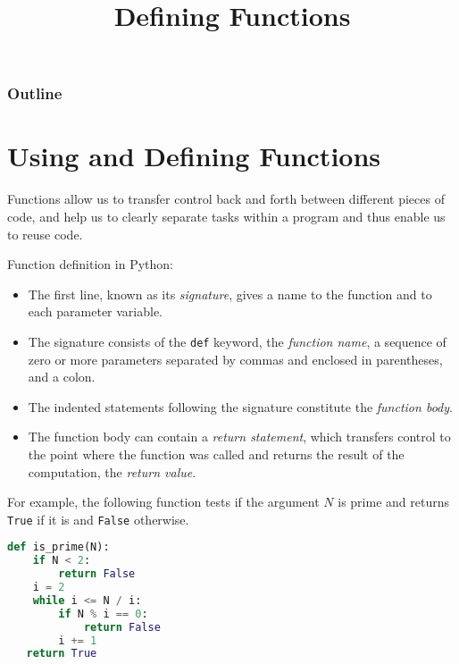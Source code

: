 \documentclass[8pt,a4paper,compress,handout]{beamer}
\title{Defining Functions}
\date{}
\begin{document}
\begin{frame}
\vfill
\titlepage
\end{frame}

\begin{frame}
\frametitle{Outline}
\tableofcontents
\end{frame}

\section{Using and Defining Functions}
\begin{frame}[fragile]
Functions allow us to transfer control back and forth between different pieces of code, and help us to clearly separate tasks within a program and thus enable us to reuse code.

\bigskip

Function definition in Python:
\begin{itemize}
\item The first line, known as its \emph{signature}, gives a name to the function and to each parameter variable.

\item The signature consists of the \lstinline{def} keyword, the \emph{function name}, a sequence of zero or more parameters separated by commas and enclosed in parentheses, and a colon.

\item The indented statements following the signature constitute the \emph{function body}.

\item The function body can contain a \emph{return statement}, which transfers control to the point where the function was called and returns the result of the computation, the \emph{return value}.
\end{itemize}

\bigskip

For example, the following function tests if the argument $N$ is prime and returns \lstinline{True} if it is and \lstinline{False} otherwise.

\begin{lstlisting}[language=Python]
def is_prime(N):
    if N < 2: 
        return False
    i = 2
    while i <= N / i:
        if N % i == 0:
            return False
        i += 1
   return True
\end{lstlisting}
\end{frame}
\end{document}
